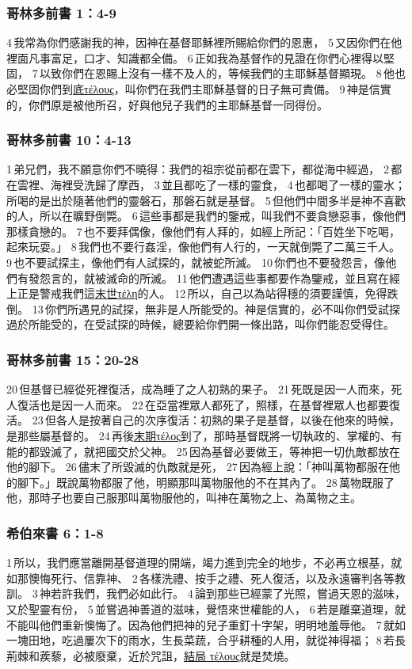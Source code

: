 \subsubsection{哥林多前書 1：4-9}
4 我常為你們感謝我的神，因神在基督耶穌裡所賜給你們的恩惠， 5 又因你們在他裡面凡事富足，口才、知識都全備。 6 正如我為基督作的見證在你們心裡得以堅固， 7 以致你們在恩賜上沒有一樣不及人的，等候我們的主耶穌基督顯現。 8 他也必堅固你們到\underline{底τέλους}，叫你們在我們主耶穌基督的日子無可責備。 9 神是信實的，你們原是被他所召，好與他兒子我們的主耶穌基督一同得份。

\subsubsection{哥林多前書 10：4-13}
1 弟兄們，我不願意你們不曉得：我們的祖宗從前都在雲下，都從海中經過， 2 都在雲裡、海裡受洗歸了摩西， 3 並且都吃了一樣的靈食， 4 也都喝了一樣的靈水；所喝的是出於隨著他們的靈磐石，那磐石就是基督。 5 但他們中間多半是神不喜歡的人，所以在曠野倒斃。 6 這些事都是我們的鑒戒，叫我們不要貪戀惡事，像他們那樣貪戀的。 7 也不要拜偶像，像他們有人拜的，如經上所記：「百姓坐下吃喝，起來玩耍。」 8 我們也不要行姦淫，像他們有人行的，一天就倒斃了二萬三千人。 9 也不要試探主，像他們有人試探的，就被蛇所滅。 10 你們也不要發怨言，像他們有發怨言的，就被滅命的所滅。 11 他們遭遇這些事都要作為鑒戒，並且寫在經上正是警戒我們這\underline{末世τέλη}的人。 12 所以，自己以為站得穩的須要謹慎，免得跌倒。 13 你們所遇見的試探，無非是人所能受的。神是信實的，必不叫你們受試探過於所能受的，在受試探的時候，總要給你們開一條出路，叫你們能忍受得住。

\subsubsection{哥林多前書 15：20-28}
20 但基督已經從死裡復活，成為睡了之人初熟的果子。 21 死既是因一人而來，死人復活也是因一人而來。 22 在亞當裡眾人都死了，照樣，在基督裡眾人也都要復活。 23 但各人是按著自己的次序復活：初熟的果子是基督，以後在他來的時候，是那些屬基督的。 24 再後\underline{末期τέλος}到了，那時基督既將一切執政的、掌權的、有能的都毀滅了，就把國交於父神。 25 因為基督必要做王，等神把一切仇敵都放在他的腳下。 26 儘末了所毀滅的仇敵就是死， 27 因為經上說：「神叫萬物都服在他的腳下。」既說萬物都服了他，明顯那叫萬物服他的不在其內了。 28 萬物既服了他，那時子也要自己服那叫萬物服他的，叫神在萬物之上、為萬物之主。

\subsubsection{希伯來書 6：1-8}
1 所以，我們應當離開基督道理的開端，竭力進到完全的地步，不必再立根基，就如那懊悔死行、信靠神、 2 各樣洗禮、按手之禮、死人復活，以及永遠審判各等教訓。 3 神若許我們，我們必如此行。 4 論到那些已經蒙了光照，嘗過天恩的滋味，又於聖靈有份， 5 並嘗過神善道的滋味，覺悟來世權能的人， 6 若是離棄道理，就不能叫他們重新懊悔了。因為他們把神的兒子重釘十字架，明明地羞辱他。 7 就如一塊田地，吃過屢次下的雨水，生長菜蔬，合乎耕種的人用，就從神得福； 8 若長荊棘和蒺藜，必被廢棄，近於咒詛，\underline{結局 τέλους}就是焚燒。

